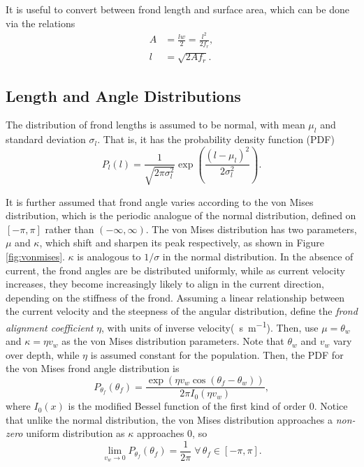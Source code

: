 It is useful to convert between frond length and surface area, which can be done via the relations
\begin{align}
  A &= \frac{lw}{2} = \frac{l^2}{2f_r}, \\
  l &= \sqrt{2Af_r}.
  \label{eqn:length-from-area}
\end{align}

\subsection{Length and Angle Distributions}
\label{sec:dist}
The distribution of frond lengths is assumed to be normal, with mean $\mu_l$ and standard deviation $\sigma_l$.
That is, it has the probability density function (PDF)
\begin{equation*}
  P_l(l) = \frac{1}{\sqrt{2\pi\sigma_l^2}}\exp\left(\frac{(l-\mu_l)^2}{2\sigma_l^2}\right).
\end{equation*}

It is further assumed that frond angle varies according to the von Mises distribution, which is the periodic analogue of the normal distribution, defined on $[-\pi,\pi]$ rather than $(-\infty,\infty)$.
The von Mises distribution has two parameters, $\mu$ and $\kappa$, which shift and sharpen its peak respectively, as shown in Figure \ref{fig:vonmises}.
$\kappa$ is analogous to $1/\sigma$ in the normal distribution.
In the absence of current, the frond angles are be distributed uniformly, while as current velocity increases, they become increasingly likely to align in the current direction, depending on the stiffness of the frond.
Assuming a linear relationship between the current velocity and the steepness of the angular distribution, define the \textit{frond alignment coefficient} $\eta$, with units of inverse velocity(\SI{}{\s\per\m}).
Then, use $\mu = \theta_w$ and $\kappa = \eta v_w$ as the von Mises distribution parameters.
Note that $\theta_w$ and $v_w$ vary over depth, while $\eta$ is assumed constant for the population.
Then, the PDF for the von Mises frond angle distribution is
\begin{equation*}
	P_{\theta_f}(\theta_f) = \frac{\exp\left(\eta v_w\cos(\theta_f-\theta_w)\right)}{2\pi I_0(\eta v_w)},
\end{equation*}
where $I_0(x)$ is the modified Bessel function of the first kind of order 0.
Notice that unlike the normal distribution, the von Mises distribution approaches a \textit{non-zero} uniform distribution as $\kappa$ approaches 0, so
\begin{equation*}
	\displaystyle \lim_{v_w \to 0}P_{\theta_f}(\theta_f) = \frac{1}{2\pi} \;\forall\, \theta_f \in [-\pi,\pi].
\end{equation*}

